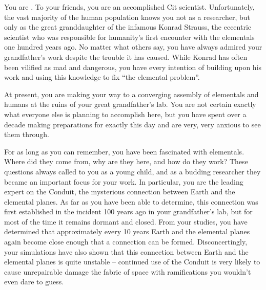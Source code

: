 \documentclass[char]{elementals}
\begin{document}
\name{\cGD{}}

You are \cGD{\intro}. To your friends, you are an accomplished Cit scientist. Unfortunately, the vast majority of the human population knows you not as a researcher, but only as the great granddaughter of the infamous Konrad Strauss, the eccentric scientist who was responsible for humanity's first encounter with the elementals one hundred years ago. No matter what others say, you have always admired your grandfather's work despite the trouble it has caused. While Konrad has often been vilified as mad and dangerous, you have every intention of building upon his work and using this knowledge to fix ``the elemental problem''.

At present, you are making your way to a converging assembly of elementals and humans at the ruins of your great grandfather's lab. You are not certain exactly what everyone else is planning to accomplish here, but you have spent over a decade making preparations for exactly this day and are very, very anxious to see them through.


For as long as you can remember, you have been fascinated with elementals. Where did they come from, why are they here, and how do they work? These questions always called to you as a young child, and as a budding researcher they became an important focus for your work. In particular, you are the leading expert on the Conduit, the mysterious connection between Earth and the elemental planes. As far as you have been able to determine, this connection was first established in the incident 100 years ago in your grandfather's lab, but for most of the time it remains dormant and closed. From your studies, you have determined that approximately every 10 years Earth and the elemental planes again become close enough that a connection can be formed. Disconcertingly, your simulations have also shown that this connection between Earth and the elemental planes is quite unstable -- continued use of the Conduit is very likely to cause unrepairable damage the fabric of space with ramifications you wouldn't even dare to guess.
\end{document}
